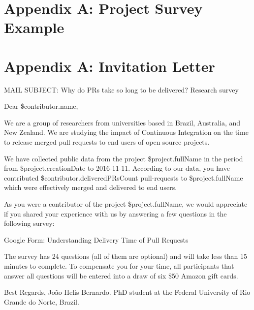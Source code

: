 	
	\newpage
	\appendix
	
	\section*{Appendix A: Project Survey Example}
	\label{sec:appendix_project_survey_example}
	
	
	
	\section*{Appendix A: Invitation Letter}
	\label{sec:appendix_invitation_latter}
	
	MAIL SUBJECT: Why do PRs take so long to be delivered? Research survey
	
	Dear \${contributor.name},
	
	We are a group of researchers from universities based in Brazil, Australia, and New Zealand. We are studying the impact of Continuous Integration on the time to release merged pull requests to end users of open source projects.
	
	We have collected public data from the project \${project.fullName} in the period from \${project.creationDate} to 2016-11-11. According to our data, you have contributed \${contributor.deliveredPRsCount} pull-requests to \${project.fullName} which were effectively merged and delivered to end users. 
	
	As you were a contributor of the project \${project.fullName}, we would appreciate if you shared your experience with us by answering a few questions in the following survey: 
	
	Google Form: Understanding Delivery Time of Pull Requests
	
	The survey has 24 questions (all of them are optional) and will take less than 15 minutes to complete. To compensate you for your time, all participants that answer all questions will be entered into a draw of six \$50 Amazon gift cards.
	
	Best Regards,
	João Helis Bernardo.
	PhD student at the Federal University of Rio Grande do Norte, Brazil.
	
	
	
